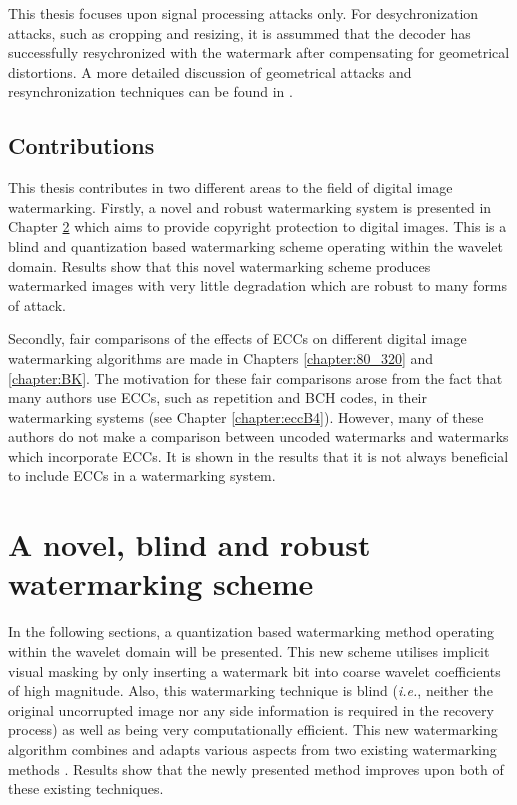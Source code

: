 \documentclass[12pt]{report}
\begin{document}
This thesis focuses upon signal processing attacks only. For desychronization attacks, such
as cropping and resizing, it is assummed that the decoder has successfully
resychronized with the watermark after compensating for geometrical distortions.
A more detailed discussion of geometrical attacks and resynchronization techniques can be found in
\cite{tpunRST1, tpunRST2, tpunRST3, tpunRST4, wangRST, linRST, senRST, ozerRST, patrickBasRST, voloGreece2001, ECCb4:volo}.



\section{Contributions}
This thesis contributes in two different areas to the field of digital image watermarking.
Firstly, a novel and robust watermarking system is presented in Chapter \ref{chapter:dugInoue} which aims
to provide copyright protection to digital images.
This is a blind and quantization based watermarking scheme operating within the wavelet domain. 
Results show that this novel watermarking scheme produces watermarked images with very little degradation which are robust 
to many forms of attack.

Secondly, fair comparisons of the effects of ECCs on different digital image watermarking
algorithms are made in Chapters 
\ref{chapter:80_320} and
\ref{chapter:BK}.
The motivation for these fair comparisons arose from the fact that many authors use ECCs, such as
repetition and BCH codes, in their watermarking systems (see Chapter \ref{chapter:eccB4}). 
However, many of these authors do not make a comparison 
between uncoded watermarks and watermarks which incorporate ECCs. 
It is shown in the results that it is not always beneficial to include ECCs in a watermarking system.


\chapter{A novel, blind and robust watermarking scheme}
\label{chapter:dugInoue}
In the following sections, a quantization based watermarking method operating within
the wavelet domain will be presented.
This new scheme utilises implicit visual masking by only inserting a watermark bit into 
coarse wavelet coefficients of high magnitude. 
Also, this watermarking technique is blind (\emph{i.e.}, neither the original uncorrupted image
nor any side information is required in the recovery process) as well as being very 
computationally efficient.
This new watermarking algorithm combines and adapts various aspects from two existing watermarking methods
\cite{dugadDI, inoueDI}. Results show that the newly presented method improves upon both
of these existing techniques.
\end{document}

